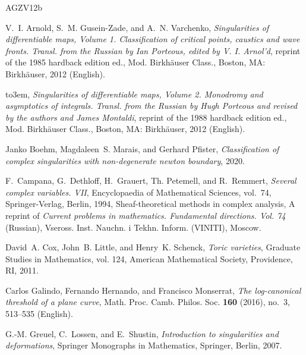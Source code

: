 \documentclass[a4paper, 12pt, oneside]{article}
\theoremstyle{plain}
\theoremstyle{definition}
\theoremstyle{remark}
\numberwithin{theorem}{section}
\numberwithin{table}{section}
\numberwithin{equation}{theorem}
\begin{document}
\newcommand{\etalchar}[1]{$^{#1}$}
\providecommand{\bysame}{\leavevmode\hbox to3em{\hrulefill}\thinspace}
\providecommand{\MR}{\relax\ifhmode\unskip\space\fi MR }
\providecommand{\MRhref}[2]{%
  \href{http://www.ams.org/mathscinet-getitem?mr=#1}{#2}
}
\providecommand{\href}[2]{#2}
\begin{thebibliography}{AGZV12b}

V.~I. Arnold, S.~M. Gusein-Zade, and A.~N. Varchenko, \emph{Singularities of
  differentiable maps, {Volume} 1. {Classification} of critical points,
  caustics and wave fronts. {Transl}. from the {Russian} by {Ian} {Porteous},
  edited by {V}. {I}. {Arnol}'d}, reprint of the 1985 hardback edition ed.,
  Mod. Birkh{\"a}user Class., Boston, MA: Birkh{\"a}user, 2012 (English).

\bysame, \emph{Singularities of differentiable maps, {Volume} 2. {Monodromy}
  and asymptotics of integrals. {Transl}. from the {Russian} by {Hugh}
  {Porteous} and revised by the authors and {James} {Montaldi}}, reprint of the
  1988 hardback edition ed., Mod. Birkh{\"a}user Class., Boston, MA:
  Birkh{\"a}user, 2012 (English).

Janko Boehm, Magdaleen~S. Marais, and Gerhard Pfister, \emph{Classification of
  complex singularities with non-degenerate newton boundary}, 2020.

\bibitem[CDG{\etalchar{+}}94]{CDG+94}
F.~Campana, G.~Dethloff, H.~Grauert, Th. Petemell, and R.~Remmert,
  \emph{Several complex variables. {VII}}, Encyclopaedia of Mathematical
  Sciences, vol.~74, Springer-Verlag, Berlin, 1994, Sheaf-theoretical methods
  in complex analysis, A reprint of {\textit{Current problems in mathematics.
  Fundamental directions. Vol. 74}} (Russian), Vseross. Inst. Nauchn. i Tekhn.
  Inform. (VINITI), Moscow.

David~A. Cox, John~B. Little, and Henry~K. Schenck, \emph{Toric varieties},
  Graduate Studies in Mathematics, vol. 124, American Mathematical Society,
  Providence, RI, 2011.

Carlos Galindo, Fernando Hernando, and Francisco Monserrat, \emph{The
  log-canonical threshold of a plane curve}, Math. Proc. Camb. Philos. Soc.
  \textbf{160} (2016), no.~3, 513--535 (English).

G.-M. Greuel, C.~Lossen, and E.~Shustin, \emph{Introduction to singularities
  and deformations}, Springer Monographs in Mathematics, Springer, Berlin,
  2007.


\end{thebibliography}
\end{document}
